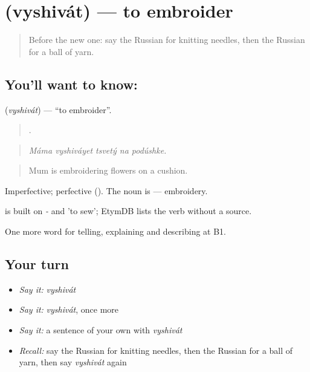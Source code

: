 \section[\texorpdfstring{\ru{вышивать} (vyshivát)}{вышивать (vyshivát)}]{ (vyshivát) — to embroider}

\label{lesson:RU-C500-vyshivat}



\begin{quote}
Before the new one: say the Russian for knitting needles, then the Russian for a ball of yarn.
\end{quote}

\subsection*{You'll want to know: }
\textbf{} (\emph{vyshivát}) — \textquotedblleft{}to embroider\textquotedblright{}.

\begin{quote}
    .
\end{quote}

\begin{quote}
\emph{Máma vyshiváyet tsvetý na podúshke.}
\end{quote}

\begin{quote}
Mum is embroidering flowers on a cushion.
\end{quote}

Imperfective; perfective  (). The noun is \emph{} — embroidery.

\begin{cousinweb}
\emph{} is built on \emph{-} and \emph{} 'to sew'; EtymDB lists the verb without a source.
\end{cousinweb}

\begin{grammarlens}[title={What you've built}]
One more word for telling, explaining and describing at B1.
\end{grammarlens}

\subsection*{Your turn}
\begin{itemize}
\raggedright
  \item \emph{Say it:} \emph{vyshivát}
  \item \emph{Say it:} \emph{vyshivát}, once more
  \item \emph{Say it:} a sentence of your own with \emph{vyshivát}
  \item \emph{Recall:} say the Russian for knitting needles, then the Russian for a ball of yarn, then say \emph{vyshivát} again
\end{itemize}

